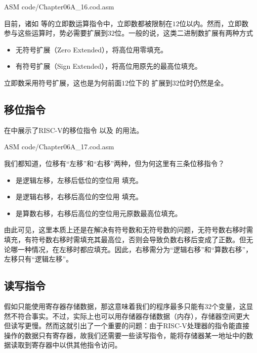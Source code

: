 \begin{Code}{ASM}
    code/Chapter06A_16.cod.asm
\end{Code}

目前，诸如 等的立即数运算指令中，立即数都被限制在$12$位以内。然而，立即数参与这些运算时，势必需要扩展到$32$位。一般的说，这类二进制数扩展有两种方式
\begin{itemize}
    \item 无符号扩展（Zero Extended），将高位用零填充。
    \item 有符号扩展（Sign Extended），将高位用原先的最高位填充。
\end{itemize}

立即数采用符号扩展，这也是为何前面$12$位下的 扩展到$32$位时仍然是全。

\subsection{移位指令}
在中展示了RISC-V的移位指令 以及 的用法。
\begin{Code}{ASM}
    code/Chapter06A_17.cod.asm
\end{Code}

我们都知道，位移有“左移”和“右移”两种，但为何这里有三条位移指令？
\begin{itemize}
    \item {} 是逻辑左移，左移后低位的空位用 填充。
    \item {} 是逻辑右移，右移后高位的空位用 填充。
    \item {} 是算数右移，右移后高位的空位用元原数最高位填充。
\end{itemize}
由此可见，这里本质上还是在解决有符号数和无符号数的问题，无符号数右移时需填充，有符号数右移时需填充其最高位，否则会导致负数右移后变成了正数。但无论哪一种情况，在左移时都应填充。因此，右移需分为“逻辑右移”和“算数右移”，左移只有“逻辑左移”。

\subsection{读写指令}
假如只能使用寄存器存储数据，那这意味着我们的程序最多只能有$32$个变量，这显然不符合事实。不过，实际上也可以用存储器存储数据（内存），存储器空间更大但读写更慢。然而这就引出了一个重要的问题：由于RISC-V处理器的指令能直接操作的数据只有寄存器，故我们还需要一些读写指令，能将存储器某一地址中的数据读取到寄存器中以供其他指令访问。

